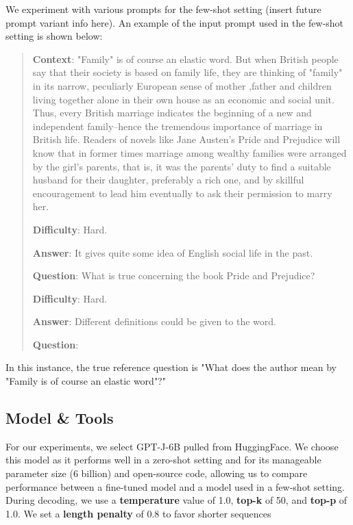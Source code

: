 \documentclass[11pt]{article}
\begin{document}
We experiment with various prompts for the few-shot setting (insert future prompt variant info here). An example of the input prompt used in the few-shot setting is shown below: 

\begin{quote}
\textbf{Context}: "Family" is of course an elastic word. But when British people say that their society is based on family life, they are thinking of "family" in its narrow, peculiarly European sense of mother ,father and children living together alone in their own house as an economic and social unit. Thus, every British marriage indicates the beginning of a new and independent family--hence the tremendous importance of marriage in British life. Readers of novels like Jane Austen's Pride and Prejudice will know that in former times marriage among wealthy families were arranged by the girl's parents, that is, it was the parents' duty to find a suitable husband for their daughter, preferably a rich one, and by skillful encouragement to lead him eventually to ask their permission to marry her. 

\textbf{Difficulty}: Hard. 

\textbf{Answer}: It gives quite some idea of English social life in the past.

\textbf{Question}: What is true concerning the book Pride and Prejudice?

\textbf{Difficulty}: Hard. 

\textbf{Answer}: Different definitions could be given to the word.

\textbf{Question}: 

\end{quote}

In this instance, the true reference question is "What does the author mean by "Family is of course an elastic word"?"

\subsection{Model \& Tools}

For our experiments, we select GPT-J-6B \citep{gpt-j:4} pulled from HuggingFace. We choose this model as it performs well in a zero-shot setting \citep{gpt-j:4} and for its manageable parameter size (6 billion) and open-source code, allowing us to compare performance between a fine-tuned model and a model used in a few-shot setting. During decoding, we use a \textbf{temperature} value of 1.0, \textbf{top-k} of 50, and \textbf{top-p} of 1.0. We set a \textbf{length penalty} of 0.8 to favor shorter sequences
\end{document}
